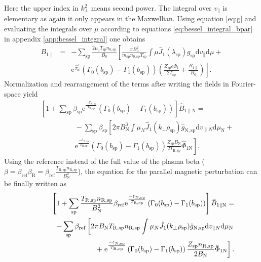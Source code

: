 \documentclass[a4paper,10pt]{article}
\newcommand{\st}[1]{\mathrm{#1}} %
\begin{document}
Here the upper index in $k_{\perp}^2$ means second power. The integral over $v_{\parallel}$ is elementary as again it only appears in the Maxwellian. Using equation \ref{eq:g} and evaluating the integrals over $\mu$ according to equations \ref{eq:bessel_integral_bpar} in appendix \ref{app:bessel_integral} one obtains
\begin{eqnarray*}
B_{1 \parallel} &=& - \sum_{\st{sp}} \frac{2 \mu_0 T_{\st{sp}} n_{0,\st{sp}}}{B_0} \left[ \frac{\pi B_0^2}{m_{\st{sp}} n_{0,\st{sp}} T_{\st{sp}}} \int \mu \hat{J}_1(\lambda_{\st{sp}}) g_{\st{sp}} \mathrm{d}v_{\parallel} \mathrm{d} \mu + \right. \nonumber \\
&& \left. \st{e}^{\frac{-\mathcal{E}}{T_{\st{sp}}}} (\Gamma_0(b_{\st{sp}}) - \Gamma_1(b_{\st{sp}})) \left( \frac{Z_{\st{sp}} e \Phi_1}{2 T_{\st{sp}}} + \frac{B_{1 \parallel}}{B_0} \right) \right].
\end{eqnarray*}
Normalization and rearrangement of the terms after writing the fields in Fourier-space yield
\begin{eqnarray}
	&& \left[ 1 + \sum_{\st{sp}} \beta_{\st{sp}} \st{e}^{\frac{-\mathcal{E}_{\st{N,sp}}}{T_{\st{R,sp}}}} \left( \Gamma_0(b_{\st{sp}}) - \Gamma_1(b_{\st{sp}}) \right) \right] \hat{B}_{1 \parallel \st{N}} = \nonumber \\
	&& \hspace{2cm} - \sum_{\st{sp}} \beta_{\st{sp}} \left[ 2 \pi B_{\st{N}}^3 \int \mu_{N} \hat{J}_1(k_{\perp} \rho_{\st{sp}}) \hat{g}_{\st{N,sp}} \mathrm{d}v_{\parallel N} \mathrm{d} \mu_{\st{N}} \right. + \nonumber \\ 
	&& \hspace{2cm} \left. \st{e}^{\frac{-\mathcal{E}_{\st{N,sp}}}{T_{\st{R,sp}}}} \left( \Gamma_0(b_{\st{sp}}) - \Gamma_1(b_{\st{sp}}) \right) \frac{Z_{\st{sp}} B_{\st{N}}}{2 T_{\st{R,sp}}} \hat{\Phi}_{1 \st{N}} \right].
	\label{eq:bpar1}
\end{eqnarray}
Using the reference instead of the full value of the plasma beta ($\beta = \beta_{\st{ref}} \beta_{\st{R}} = \beta_{\st{ref}} \frac{T_{\st{R,sp}} n_{\st{R,sp}}}{B_{\st{N}}^2}$), the equation for the parallel magnetic perturbation can be finally written as
\begin{eqnarray}
	&& \hspace{-1cm} \left[ 1 + \sum_{\st{sp}} \frac{T_{\st{R,sp}} n_{\st{R,sp}}}{B_{\st{N}}^2} \beta_{\st{ref}} \st{e}^{\frac{-\mathcal{E}_{\st{N,sp}}}{T_{\st{R,sp}}}} \left( \Gamma_0(b_{\st{sp}}) - \Gamma_1(b_{\st{sp}}) \right) \right] \hat{B}_{1 \parallel \st{N}} = \nonumber \\
	&& \hspace{1cm} - \sum_{\st{sp}} \beta_{\st{ref}} \left[ 2 \pi B_{\st{N}} T_{\st{R,sp}} n_{\st{R,sp}} \int \mu_{N} \hat{J}_1(k_{\perp} \rho_{\st{sp}}) \hat{g}_{\st{N,sp}} \mathrm{d}v_{\parallel N} \mathrm{d} \mu_{\st{N}} \right. \nonumber\\
	&& \hspace{1cm} + \left. \st{e}^{\frac{-\mathcal{E}_{\st{N,sp}}}{T_{\st{R,sp}}}} \left( \Gamma_0(b_{\st{sp}}) - \Gamma_1(b_{\st{sp}}) \right) \frac{Z_{\st{sp}} n_{\st{R,sp}}}{2 B_{\st{N}}} \hat{\Phi}_{1 \st{N}} \right].
	\label{eq:bpar}
\end{eqnarray}
\end{document}
